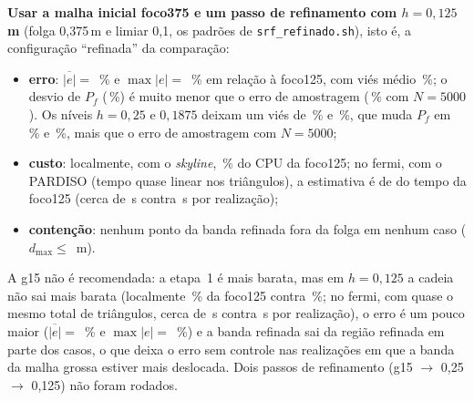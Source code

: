 \textbf{Usar a malha inicial foco375 e um passo de refinamento com $h = 0{,}125$\,m} (folga 0,375\,m e limiar 0,1, os
padrões de \texttt{srf\_refinado.sh}), isto é, a configuração ``refinada'' da comparação:
\begin{itemize}
  \item \textbf{erro}: $\overline{|e|} = $ \nivFCEabs\,\% e $\max|e| = $ \nivFCEmax\,\% em relação à foco125, com viés
        médio \nivFCEmed\,\%; o desvio de $P_f$ (\nivFCDpfAbs\,\%) é muito menor que o erro de amostragem
        (\nivCvCinco\,\% com $N = 5000$). Os níveis $h = 0{,}25$ e $0{,}1875$ deixam um viés de \nivFAEmed\,\% e
        \nivFBEmed\,\%, que muda $P_f$ em \nivFADpfAbs\,\% e \nivFBDpfAbs\,\%, mais que o erro de amostragem com
        $N = 5000$;
  \item \textbf{custo}: localmente, com o \emph{skyline}, \nivFCRpct\,\% do CPU da foco125; no fermi, com o PARDISO
        (tempo quase linear nos triângulos), a estimativa é de \nivFermiRazFC{} do tempo da foco125 (cerca de
        \nivFermiTFC\,s contra \nivFermiTFfixD\,s por realização);
  \item \textbf{contenção}: nenhum ponto da banda refinada fora da folga em nenhum caso ($d_{\max} \le$
        \nivFCDist\,m).
\end{itemize}
A g15 não é recomendada: a etapa~1 é mais barata, mas em $h = 0{,}125$ a cadeia não sai mais barata (localmente
\nivGCRpct\,\% da foco125 contra \nivFCRpct\,\%; no fermi, com quase o mesmo total de triângulos, cerca de
\nivFermiTGC\,s contra \nivFermiTFC\,s por realização), o erro é um pouco maior ($\overline{|e|} = $ \nivGCEabs\,\% e $\max|e| = $ \nivGCEmax\,\%) e a banda
refinada sai da região refinada em parte dos casos, o que deixa o erro sem controle nas realizações em que a banda da
malha grossa estiver mais deslocada. Dois passos de refinamento (g15 $\to$ 0,25 $\to$ 0,125) não foram rodados.

